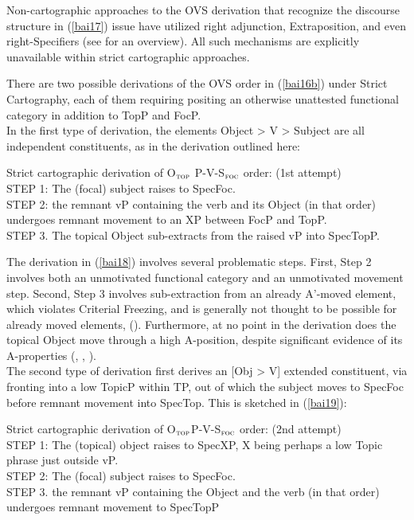 \documentclass[output=paper,colorlinks,citecolor=brown,
]{langscibook}
\begin{document}
Non-cartographic approaches to the OVS derivation that recognize the discourse structure in (\ref{bai17}) issue have utilized right adjunction, Extraposition, and even right-Specifiers (see \citealt{Bailyn2012} for an overview). All such mechanisms are explicitly unavailable within strict cartographic approaches. 

There are two possible derivations of the OVS order in (\ref{bai16b}) under Strict Cartography, each of them requiring positing an otherwise unattested functional category in addition to TopP and FocP.  \\ 
In the first type of derivation, the elements Object > V > Subject are all independent constituents, as in the derivation outlined here:

\begin{exe}
\ex \label{bai18}
Strict cartographic derivation of O$_{\textsc{top}}$ P-V-S$_{\textsc{foc}}$ order: (1st attempt) \\
STEP 1:  The (focal) subject raises to SpecFoc. \\
STEP 2:  the remnant vP containing the verb and its Object (in that order) undergoes remnant movement to an XP between FocP and TopP. \\
STEP 3.  The topical Object sub-extracts from the raised vP into SpecTopP.\\

\end{exe}

The derivation in (\ref{bai18}) involves several problematic steps. First, Step 2 involves both an unmotivated functional category and an unmotivated movement step. Second, Step 3 involves sub-extraction from an already A’-moved element, which violates \citealt{Rizzi2004} Criterial Freezing, and is generally not thought to be possible for already moved elements, (\citealt{Stepanov2007}). Furthermore, at no point in the derivation does the topical Object move through a high A-position, despite significant evidence of its A-properties (\citealt{Bailyn2004}, \citealt{Antonyuk2021}, \citealt{Pereltsvaig2021}). \\

The second type of derivation first derives an [Obj > V] extended constituent, via fronting into a low TopicP within TP, out of which the subject moves to SpecFoc before remnant movement into SpecTop.  This is sketched in (\ref{bai19}): 

\begin{exe}
\ex \label{bai19}
Strict cartographic derivation of O$_{\textsc{top}}$P-V-S$_{\textsc{foc}}$ order: (2nd attempt) \\
STEP 1:  The (topical) object raises to SpecXP, X being perhaps a low Topic phrase just outside vP. \\
STEP 2:  The (focal) subject raises to SpecFoc. \\
STEP 3.  the remnant vP containing the Object and the verb (in that order) undergoes remnant movement to SpecTopP \\
\end{exe}
\end{document}
